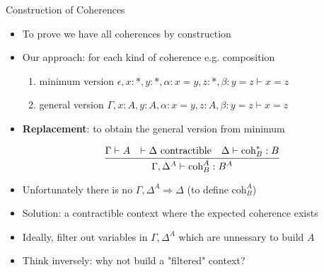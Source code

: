 \documentclass[12pt, mathserif,handout]{beamer}
\begin{document}
\begin{frame}[allowframebreaks,c]{Construction of Coherences}

\begin{itemize}

\item To prove we have all coherences by construction

\item Our approach: for each kind of coherence e.g. composition
\begin{enumerate}
\item minimum version
  $\epsilon,x : *, y : *, \alpha : x = y, z: *,
  \beta : y = z \vdash x = z$
\item general version
  $\Gamma,x : A, y : A, \alpha : x = y, z: A,
  \beta : y = z \vdash x = z$
\end{enumerate}





\item \textbf{Replacement}: to obtain the general version from minimum

\begin{equation*}
\infer{\Gamma, \Delta^{A} \vdash \text{coh}_B^{A} : B^{A}}
{\Gamma \vdash A & \vdash \Delta~ \text{contractible} & \Delta \vdash \text{coh}_B^{*} : B} 
\end{equation*}


\item Unfortunately there is no $\Gamma, \Delta^{A} \Rightarrow \Delta$ (to define $\text{coh}_B^{A}$)

\framebreak

\item Solution: a contractible context where the expected coherence exists
\item Ideally, filter out variables in $\Gamma, \Delta^{A}$ which are unnessary to build $A$
\item Think inversely: why not build a "filtered" context?


\end{itemize}
\end{frame}
\end{document}
